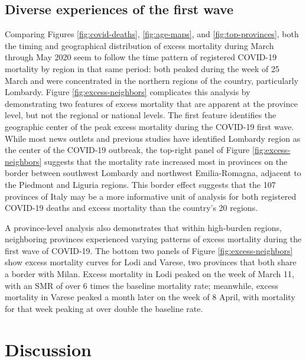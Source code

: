 \documentclass[
]{article}
\begin{document}
\hypertarget{diverse-experiences-of-the-first-wave}{%
\subsection{Diverse experiences of the first wave}\label{diverse-experiences-of-the-first-wave}}

Comparing Figures \ref{fig:covid-deaths}, \ref{fig:age-maps}, and \ref{fig:top-provinces}, both the timing and geographical distribution of excess mortality during March through May 2020 seem to follow the time pattern of registered COVID-19 mortality by region in that same period: both peaked during the week of 25 March and were concentrated in the northern regions of the country, particularly Lombardy. Figure \ref{fig:excess-neighbors} complicates this analysis by demonstrating two features of excess mortality that are apparent at the province level, but not the regional or national levels. The first feature identifies the geographic center of the peak excess mortality during the COVID-19 first wave. While most news outlets and previous studies have identified Lombardy region as the center of the COVID-19 outbreak, the top-right panel of Figure \ref{fig:excess-neighbors} suggests that the mortality rate increased most in provinces on the border between southwest Lombardy and northwest Emilia-Romagna, adjacent to the Piedmont and Liguria regions. This border effect suggests that the 107 provinces of Italy may be a more informative unit of analysis for both registered COVID-19 deaths and excess mortality than the country's 20 regions.

A province-level analysis also demonstrates that within high-burden regions, neighboring provinces experienced varying patterns of excess mortality during the first wave of COVID-19. The bottom two panels of Figure \ref{fig:excess-neighbors} show excess mortality curves for Lodi and Varese, two provinces that both share a border with Milan. Excess mortality in Lodi peaked on the week of March 11, with an SMR of over 6 times the baseline mortality rate; meanwhile, excess mortality in Varese peaked a month later on the week of 8 April, with mortality for that week peaking at over double the baseline rate.

\hypertarget{discussion}{%
\section{Discussion}\label{discussion}}
\end{document}
